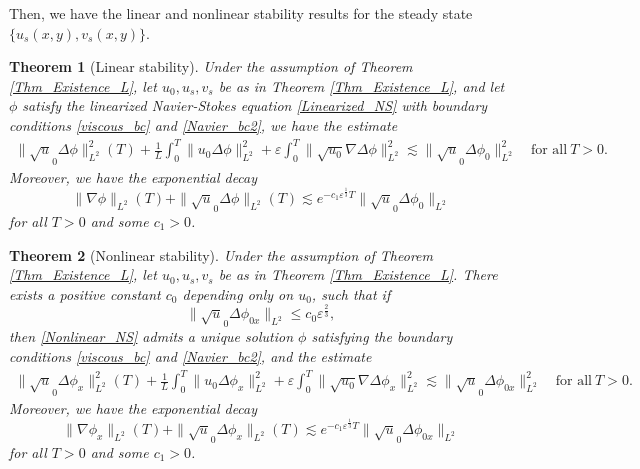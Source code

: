 \documentclass[reqno, 11pt]{amsart}
\theoremstyle{plain}
\newtheorem{theorem}{Theorem}[section]
\theoremstyle{definition}
\theoremstyle{remark}
\numberwithin{equation}{section}
\begin{document}
Then, we have the linear and nonlinear stability results for the steady state $\{ u_s(x,y), v_s(x,y) \}$.

\begin{theorem}[Linear stability]\label{Thm_L_linear}
Under the assumption of Theorem \ref{Thm_Existence_L}, let $u_0, u_s, v_s$ be as in Theorem \ref{Thm_Existence_L}, and let $\phi$ satisfy the linearized Navier-Stokes equation \eqref{Linearized_NS} with boundary conditions \eqref{viscous_bc} and \eqref{Navier_bc2}, we have the estimate
\begin{equation}\label{est:L_linear}
\begin{aligned}
\|\sqrt u_0 \Delta \phi\|_{L^2}^2(T) + \frac{1}{L} \int_0^T \| u_0 \Delta \phi \|_{L^2}^2 + \varepsilon \int_0^T  \| \sqrt{u_0} \nabla \Delta \phi \|_{L^2}^2 \lesssim  \|\sqrt u_0 \Delta \phi_0\|_{L^2}^2 \quad \mbox{for all}~T > 0.
\end{aligned}
\end{equation}
Moreover, we have the exponential decay
\begin{equation}\label{est:L_linear_enhance}
\| \nabla \phi\|_{L^2}(T) + \| \sqrt u_0 \Delta \phi\|_{L^2}(T) \lesssim e^{- c_1 \varepsilon^{\frac{1}{3}} T}\|\sqrt u_0 \Delta \phi_0\|_{L^2}
\end{equation}
for all $T > 0$ and some $c_1 > 0$.
\end{theorem}

\begin{theorem}[Nonlinear stability]\label{Thm_L_nonlinear}
Under the assumption of Theorem \ref{Thm_Existence_L}, let $u_0, u_s, v_s$ be as in Theorem \ref{Thm_Existence_L}. There exists a positive constant $c_0$ depending only on $u_0$, such that if
\begin{equation}\label{L_initial}
\|\sqrt u_0 \Delta \phi_{0x}\|_{L^2} \le c_0 \varepsilon^{\frac{2}{3}},
\end{equation}
then \eqref{Nonlinear_NS} admits a unique solution $\phi$ satisfying the boundary conditions \eqref{viscous_bc} and \eqref{Navier_bc2}, and the estimate
\begin{equation}\label{est:L_nonlinear}
\begin{aligned}
\|\sqrt u_0 \Delta \phi_x\|_{L^2}^2(T) + \frac{1}{L} \int_0^T \| u_0 \Delta \phi_x \|_{L^2}^2 + \varepsilon \int_0^T  \| \sqrt{u_0} \nabla \Delta \phi_x \|_{L^2}^2 \lesssim  \|\sqrt u_0 \Delta \phi_{0x}\|_{L^2}^2 \quad \mbox{for all}~T > 0.
\end{aligned}
\end{equation}
Moreover, we have the exponential decay
\begin{equation}\label{est:L_nonlinear_enhance}
\| \nabla \phi_x\|_{L^2}(T) + \| \sqrt u_0 \Delta \phi_x\|_{L^2}(T) \lesssim e^{- c_1 \varepsilon^{\frac{1}{3}} T} \|\sqrt u_0 \Delta \phi_{0x}\|_{L^2}
\end{equation}
for all $T > 0$ and some $c_1 > 0$.\\
\end{theorem}
\end{document}
